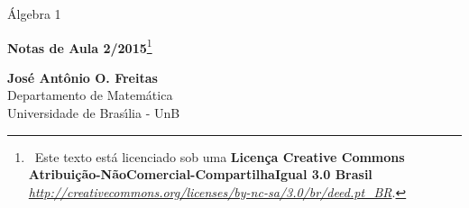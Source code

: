 \begin{titlepage}
\begin{center}
\vspace*{-1.5cm}

Álgebra 1


\vspace*{3.5cm}

{\fontsize{14pt}{14pt}\selectfont
   \textbf{Notas de Aula 2/2015}\footnote{\ccbyncsa\ Este texto est\'a licenciado sob uma \textbf{Licen\c{c}a Creative Commons Atribui\c{c}\~ao-N\~aoComercial-CompartilhaIgual 3.0 Brasil} \href{http://creativecommons.org/licenses/by-nc-sa/3.0/br/deed.pt\_BR}{\textit{http://creativecommons.org/licenses/by-nc-sa/3.0/br/deed.pt\_BR}}.}
   }


\vfill

{\fontsize{14pt}{14pt}\selectfont\textbf{Jos\'e Ant\^onio O. Freitas}\\ Departamento de Matem\'atica\\Universidade de Bras{\'\i}lia - UnB}
\end{center}
\end{titlepage}
\vspace*{-2cm}